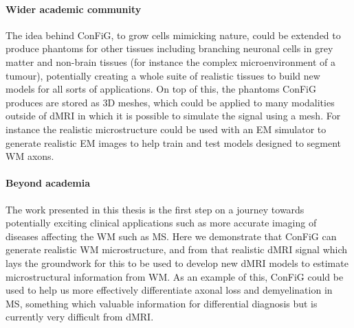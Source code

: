 \paragraph{Wider academic community}
The idea behind \ac{ConFiG}, to grow cells mimicking nature, could be extended to produce phantoms for other tissues including branching neuronal cells in grey matter and non-brain tissues (for instance the complex microenvironment of a tumour), potentially creating a whole suite of realistic tissues to build new models for all sorts of applications.
On top of this, the phantoms \ac{ConFiG} produces are stored as 3D meshes, which could be applied to many modalities outside of \ac{dMRI} in which it is possible to simulate the signal using a mesh.
For instance the realistic microstructure could be used with an \ac{EM} simulator to generate realistic \ac{EM} images to help train and test models designed to segment \ac{WM} axons. 


\paragraph{Beyond academia}
The work presented in this thesis is the first step on a journey towards potentially exciting clinical applications such as more accurate imaging of diseases affecting the \ac{WM} such as \ac{MS}. Here we demonstrate that \ac{ConFiG} can generate realistic \ac{WM} microstructure, and from that realistic \ac{dMRI} signal which lays the groundwork for this to be used to develop new \ac{dMRI} models to estimate microstructural information from \ac{WM}.
As an example of this, \ac{ConFiG} could be used to help us more effectively differentiate axonal loss and demyelination in \ac{MS}, something which valuable information for differential diagnosis but is currently very difficult from \ac{dMRI}.

\acresetall
